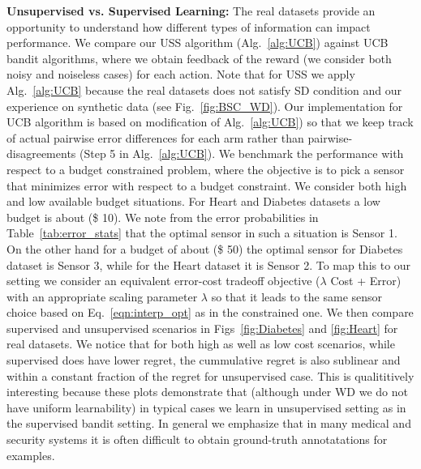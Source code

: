 \noindent
{\bf Unsupervised vs. Supervised Learning:}
The real datasets provide an opportunity to understand how different types of information can impact performance. We compare our USS algorithm (Alg.~\ref{alg:UCB}) against UCB bandit algorithms, where we obtain feedback of the reward (we consider both noisy and noiseless cases) for each action. Note that for USS we apply Alg.~\ref{alg:UCB} because the real datasets does not satisfy SD condition and our experience on synthetic data (see Fig.~\ref{fig:BSC_WD}). Our implementation for UCB algorithm is based on modification of Alg.~\ref{alg:UCB}) so that we keep track of actual pairwise error differences for each arm rather than pairwise-disagreements (Step 5 in Alg.~\ref{alg:UCB}). We benchmark the performance with respect to a budget constrained problem, where the objective is to pick a sensor that minimizes error with respect to a budget constraint. We consider both high and low available budget situations. For Heart and Diabetes datasets a low budget is about (\$ 10). We note from the error probabilities in Table~\ref{tab:error_stats} that the optimal sensor in such a situation is Sensor 1. On the other hand for a budget of about (\$ 50) the optimal sensor for Diabetes dataset is Sensor 3, while for the Heart dataset it is Sensor 2. To map this to our setting we consider an equivalent error-cost tradeoff objective ($\lambda$ Cost + Error) with an appropriate scaling parameter $\lambda$ so that it leads to the same sensor choice based on Eq.~\ref{eqn:interp_opt} as in the constrained one. We then compare supervised and unsupervised scenarios in Figs~\ref{fig:Diabetes} and \ref{fig:Heart} for real datasets. We notice that for both high as well as low cost scenarios, while supervised does have lower regret, the cummulative regret is also sublinear and within a constant fraction of the regret for unsupervised case. This is qualititively interesting because these plots demonstrate that (although under WD we do not have uniform learnability) in typical cases we learn in unsupervised setting as in the supervised bandit setting. In general we emphasize that in many medical and security systems it is often difficult to obtain ground-truth annotatations for examples.



